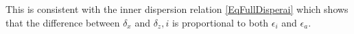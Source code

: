 \documentclass[a4paper,11pt]{article}
\begin{document}
This is consistent with the inner dispersion relation \ref{EqFullDisperai} which shows that the difference between $\delta_x$ and $\delta_z,i$ is proportional to both $\epsilon_i$ and $\epsilon_a$.


\end{document}
